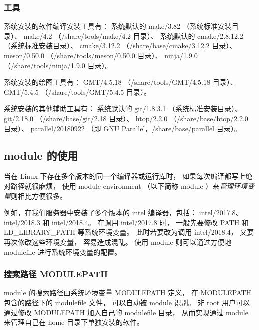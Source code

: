 \documentclass[UTF8]{ctexart}
\begin{document}
\subsubsection{工具}
系统安装的软件编译安装工具有：\newline
系统默认的 make/3.82 （系统标准安装目录）、\newline
make/4.2 （/share/tools/make/4.2 目录）、\newline
系统默认的 cmake/2.8.12.2 （系统标准安装目录）、\newline
cmake/3.12.2 （/share/base/cmake/3.12.2 目录）、\newline
meson/0.50.0 （/share/tools/meson/0.50.0 目录）、\newline
ninja/1.9.0 （/share/tools/ninja/1.9.0 目录）。
\bigskip

系统安装的绘图工具有：\newline
GMT/4.5.18 （/share/tools/GMT/4.5.18 目录）、\newline
GMT/5.4.5 （/share/tools/GMT/5.4.5 目录）。
\bigskip

系统安装的其他辅助工具有：\newline
系统默认的 git/1.8.3.1 （系统标准安装目录）、\newline
git/2.18.0 （/share/base/git/2.18 目录）、\newline
htop/2.2.0 （/share/base/htop/2.2.0 目录）、\newline
parallel/20180922 （即 GNU Parallel，/share/base/parallel 目录）。

\subsection{module 的使用}
当在 Linux 下存在多个版本的同一个编译器或运行库时，
如果每次编译都写上绝对路径就很麻烦，
使用 module-environment （以下简称 module ）来{\em 管理环境变量}则相比方便很多。

例如，在我们服务器中安装了多个版本的 intel 编译器，包括：
intel/2017.8、intel/2018.3 和 intel/2018.4。
在调用 intel/2017.8 时，
一般先要修改 PATH 和 LD\_LIBRARY\_PATH 等系统环境变量。
此时若要改为调用 intel/2018.4，
又要再次修改这些环境变量，
容易造成混乱。
使用 module 则可以通过方便地 modulefile 进行系统环境变量的配置。

\subsubsection{搜索路径 MODULEPATH}
module 的搜索路径由系统环境变量 MODULEPATH 定义，
在 MODULEPATH 包含的路径下的 modulefile 文件，
可以自动被 module 识别。
非 root 用户可以通过修改 MODULEPATH 加入自己的 modulefile 目录，
从而实现通过 module 来管理自己在 home 目录下单独安装的软件。
\end{document}
